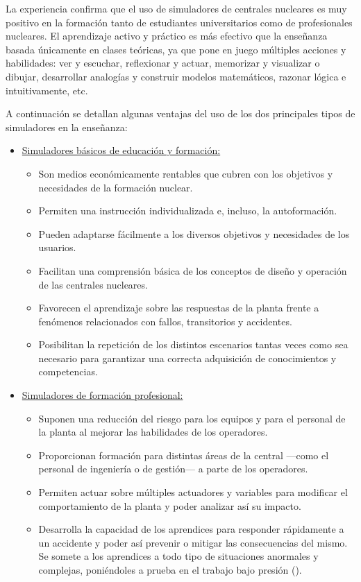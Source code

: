 La experiencia confirma que el uso de simuladores de centrales nucleares es muy positivo en la formación tanto de estudiantes universitarios como de profesionales nucleares. El aprendizaje activo y práctico es más efectivo que la enseñanza basada únicamente en clases teóricas, ya que pone en juego múltiples acciones y habilidades: ver y escuchar, reflexionar y actuar, memorizar y visualizar o dibujar, desarrollar analogías y construir modelos matemáticos, razonar lógica e intuitivamente, etc.

A continuación se detallan algunas ventajas del uso de los dos principales tipos de simuladores en la enseñanza:

\begin{itemize}
  \item \underline{Simuladores básicos de educación y formación:}
  \begin{itemize}
    \item Son medios económicamente rentables que cubren con los objetivos y necesidades de la formación nuclear.
    \item Permiten una instrucción individualizada e, incluso, la autoformación.
    \item Pueden adaptarse fácilmente a los diversos objetivos y necesidades de los usuarios.
    \item Facilitan una comprensión básica de los conceptos de diseño y operación de las centrales nucleares.
    \item Favorecen el aprendizaje sobre las respuestas de la planta frente a fenómenos relacionados con fallos, transitorios y accidentes.
    \item Posibilitan la repetición de los distintos escenarios tantas veces como sea necesario para garantizar una correcta adquisición de conocimientos y competencias.
  \end{itemize}
  \item \underline{Simuladores de formación profesional:}
  \begin{itemize}
    \item Suponen una reducción del riesgo para los equipos y para el personal de la planta al mejorar las habilidades de los operadores.
    \item Proporcionan formación para distintas áreas de la central ---como el personal de ingeniería o de gestión--- a parte de los operadores.
    \item Permiten actuar sobre múltiples actuadores y variables para modificar el comportamiento de la planta y poder analizar así su impacto.
    \item Desarrolla la capacidad de los aprendices para responder rápidamente a un accidente y poder así prevenir o mitigar las consecuencias del mismo. Se somete a los aprendices a todo tipo de situaciones anormales y complejas, poniéndoles a prueba en el trabajo bajo presión (\cite{international2019iaea}).
  \end{itemize} 
\end{itemize}

